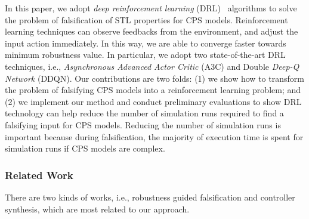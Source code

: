 In this paper, we adopt \emph{deep reinforcement learning}   (DRL)~\cite{mnih2015human} algorithms to solve the problem of falsification of STL properties for CPS models.
Reinforcement learning techniques can observe feedbacks from the environment, and adjust the input action immediately. In this way, we are able to converge faster towards minimum robustness value.
In particular, we adopt two state-of-the-art DRL techniques, i.e., \emph{Asynchronous Advanced Actor Critic} (A3C) and Double \emph{Deep-Q Network} (DDQN).
Our contributions are two folds:
(1) we show how to transform the problem of falsifying CPS models into a reinforcement learning problem; and
(2) we implement our method and conduct preliminary evaluations to show DRL technology can help reduce the number of simulation runs required to find a falsifying input for CPS models.
Reducing the number of simulation runs is important because during falsification, the majority of execution time is spent for simulation runs if CPS models are complex.

\subsubsection{Related Work}
There are two kinds of works, i.e., robustness guided falsification and controller synthesis, which are most related to our approach.


